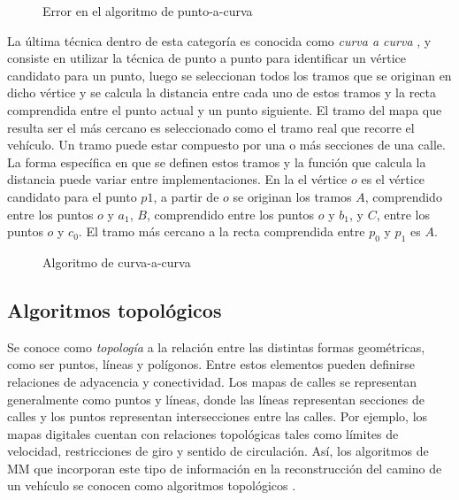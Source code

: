 \begin{figure}[h]
	\centering
	
	\caption{Error en el algoritmo de punto-a-curva}
	\label{fig:punto-a-curva} 
\end{figure}

La última técnica dentro de esta categoría es conocida como \emph{curva a curva} \citep{white2000some}, y consiste en  utilizar la técnica de punto a punto para identificar un vértice candidato para un punto, luego se seleccionan todos los tramos que se originan en dicho vértice y se calcula la distancia entre cada uno de estos tramos y la recta comprendida entre el punto actual y un punto siguiente. El tramo del mapa que resulta ser el más cercano es seleccionado como el tramo real que recorre el vehículo. Un tramo puede estar compuesto por una o más secciones de una calle. La forma específica en que se definen estos tramos y la función que calcula la distancia puede variar entre implementaciones. En la  el vértice $o$ es el vértice candidato para el punto $p1$, a partir de $o$ se originan los tramos $A$, comprendido entre los puntos $o$ y $a_1$, $B$, comprendido entre los puntos $o$ y $b_1$, y $C$, entre los puntos $o$ y $c_0$. El tramo más cercano a la recta comprendida entre $p_0$ y $p_1$ es $A$. 

\begin{figure}[h]
	\centering
	
	\caption{Algoritmo de curva-a-curva}
	\label{fig:curva-a-curva} 
\end{figure}

\subsection{Algoritmos topológicos}

Se conoce como \emph{topología} a la relación entre las distintas formas geométricas, como ser puntos, líneas y polígonos. Entre estos elementos pueden definirse relaciones de adyacencia y conectividad. Los mapas de calles se representan generalmente como puntos y líneas, donde las líneas representan secciones de calles y los puntos representan intersecciones entre las calles. Por ejemplo, los mapas digitales cuentan con relaciones topológicas tales como límites de velocidad, restricciones de giro y sentido de circulación. Así, los algoritmos de MM que incorporan este tipo de información en la reconstrucción del camino de un vehículo se conocen como algoritmos topológicos \citep{quddus2007current}.

